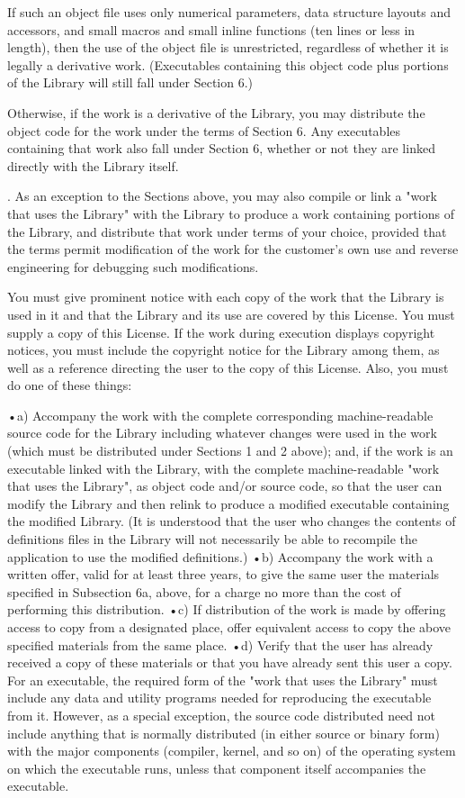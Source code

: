If such an object file uses only numerical parameters, data structure layouts and accessors, and small macros and small inline functions (ten lines or less in length), then the use of the object file is unrestricted, regardless of whether it is legally a derivative work. (Executables containing this object code plus portions of the Library will still fall under Section 6.) 

Otherwise, if the work is a derivative of the Library, you may distribute the object code for the work under the terms of Section 6. Any executables containing that work also fall under Section 6, whether or not they are linked directly with the Library itself. 

. As an exception to the Sections above, you may also compile or link a "work that uses the Library" with the Library to produce a work containing portions of the Library, and distribute that work under terms of your choice, provided that the terms permit modification of the work for the customer's own use and reverse engineering for debugging such modifications. 

You must give prominent notice with each copy of the work that the Library is used in it and that the Library and its use are covered by this License. You must supply a copy of this License. If the work during execution displays copyright notices, you must include the copyright notice for the Library among them, as well as a reference directing the user to the copy of this License. Also, you must do one of these things: 

•a) Accompany the work with the complete corresponding machine-readable source code for the Library including whatever changes were used in the work (which must be distributed under Sections 1 and 2 above); and, if the work is an executable linked with the Library, with the complete machine-readable "work that uses the Library", as object code and/or source code, so that the user can modify the Library and then relink to produce a modified executable containing the modified Library. (It is understood that the user who changes the contents of definitions files in the Library will not necessarily be able to recompile the application to use the modified definitions.) 
•b) Accompany the work with a written offer, valid for at least three years, to give the same user the materials specified in Subsection 6a, above, for a charge no more than the cost of performing this distribution. 
•c) If distribution of the work is made by offering access to copy from a designated place, offer equivalent access to copy the above specified materials from the same place. 
•d) Verify that the user has already received a copy of these materials or that you have already sent this user a copy. 
For an executable, the required form of the "work that uses the Library" must include any data and utility programs needed for reproducing the executable from it. However, as a special exception, the source code distributed need not include anything that is normally distributed (in either source or binary form) with the major components (compiler, kernel, and so on) of the operating system on which the executable runs, unless that component itself accompanies the executable. 

